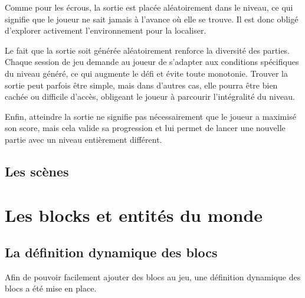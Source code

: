 \documentclass[10pt]{report}
\begin{document}
Comme pour les écrous, la sortie est placée aléatoirement dans le niveau, ce qui signifie que le joueur ne sait jamais à l’avance où elle se trouve. Il est donc obligé d’explorer activement l’environnement pour la localiser.

Le fait que la sortie soit générée aléatoirement renforce la diversité des parties. Chaque session de jeu demande au joueur de s’adapter aux conditions spécifiques du niveau généré, ce qui augmente le défi et évite toute monotonie. Trouver la sortie peut parfois être simple, mais dans d’autres cas, elle pourra être bien cachée ou difficile d’accès, obligeant le joueur à parcourir l’intégralité du niveau.

Enfin, atteindre la sortie ne signifie pas nécessairement que le joueur a maximisé son score, mais cela valide sa progression et lui permet de lancer une nouvelle partie avec un niveau entièrement différent.



\subsection{Les scènes}


\section{Les blocks et entités du monde}
\subsection{La définition dynamique des blocs}

Afin de pouvoir facilement ajouter des blocs au jeu, une définition dynamique des blocs a été mise en place.
\end{document}
